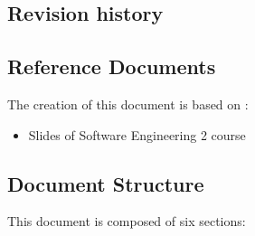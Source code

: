 \subsection{Revision history}



\subsection{Reference Documents}
The creation of this document is based on :
\begin{itemize}
    \item Slides of Software Engineering 2 course
\end{itemize}


\subsection{Document Structure}
This document is composed of six sections:
